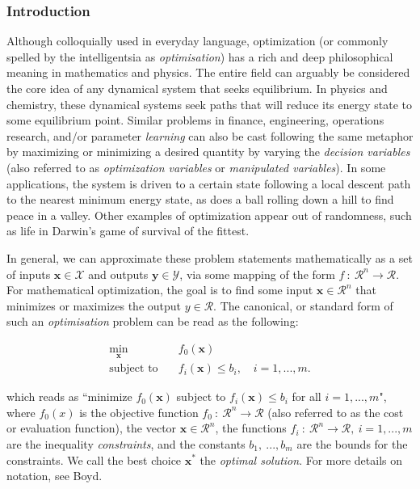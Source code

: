 
\newpage

\subsubsection{Introduction}
Although colloquially used in everyday language, optimization (or commonly spelled by the intelligentsia as \textit{optimisation}) has a rich and deep philosophical meaning in mathematics and physics. The entire field can arguably be considered the core idea of any dynamical system that seeks equilibrium. In physics and chemistry, these dynamical systems seek paths that will reduce its energy state to some equilibrium point. Similar problems in finance, engineering, operations research, and/or parameter \textit{learning} can also be cast following the same metaphor by maximizing or minimizing a desired quantity by varying the \textit{decision variables} (also referred to as \textit{optimization variables} or \textit{manipulated variables}). In some applications, the system is driven to a certain state following a local descent path to the nearest minimum energy state, as does a ball rolling down a hill to find peace in a valley. Other examples of optimization appear out of randomness, such as life in Darwin's game of survival of the fittest. 

In general, we can approximate these problem statements mathematically as a set of inputs $\boldsymbol{x} \in \mathcal{X}$ and outputs $\boldsymbol{y} \in \mathcal{Y}$, via some mapping of the form $f \ : \ \mathcal{R}^n \rightarrow \mathcal{R}$. For mathematical optimization, the goal is to find some input $\boldsymbol{x} \in \mathcal{R}^n$ that minimizes or maximizes the output $y \in \mathcal{R}$. The canonical, or standard form of such an \textit{optimisation} problem can be read as the following: 

\begin{align*}
    \min_{\boldsymbol{x}} \quad & f_0(\boldsymbol{x}) \\
    \text{subject to} \quad & f_i(\boldsymbol{x}) \leq b_i, \quad i = 1, ..., m. 
\end{align*}

which reads as ``minimize $f_0(\boldsymbol{x})$ subject to $f_i(\boldsymbol{x}) \leq b_i$ for all $i = 1, ..., m$", where $f_0(x)$ is the objective function $f_0 \ : \ \mathcal{R}^n \rightarrow \mathcal{R}$ (also referred to as the cost or evaluation function), the vector $\boldsymbol{x} \in \mathcal{R}^n$, the functions $f_i \ : \ \mathcal{R}^n \rightarrow \mathcal{R}, \ i = 1, ..., m$ are the inequality \textit{constraints}, and the constants $b_1, \ ..., b_m$ are the bounds for the constraints. We call the best choice $\boldsymbol{x}^\ast$ the \textit{optimal solution}. For more details on notation, see Boyd. 

